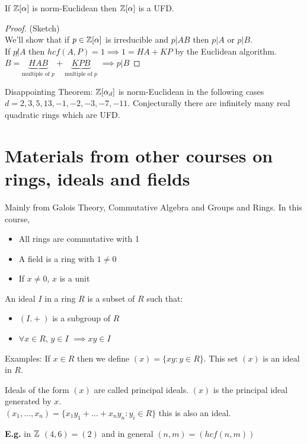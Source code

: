 \documentclass[11pt]{article}
\begin{document}
\begin{prop}
	If $\mathbb{Z}[\alpha]$ is norm-Euclidean then $\mathbb{Z}[\alpha]$ is a UFD.
\end{prop}
\begin{proof}
	(Sketch)\\
	We'll show that if $p \in \mathbb{Z}[\alpha]$ is irreducible and $p|AB$ then $p|A$ or $p|B$.\\
	If $p \not | A $ then $ hcf(A,P) = 1 \implies 1 = HA+KP$ by the Euclidean algorithm.\\
	$B = \underbrace{HAB}_\text{multiple of $p$} +\underbrace{KPB}_\text{multiple of $p$}$ $\implies p | B$
\end{proof}

\begin{theorem}
	Disappointing Theorem: $\mathbb{Z}[\alpha_d] $ is norm-Euclidean in the following cases $d = 2,3,5,13,-1,-2,-3,-7,-11$.
	Conjecturally there are infinitely many real quadratic rings which are UFD.
\end{theorem}

\section{Materials from other courses on rings, ideals and fields}
Mainly from Galois Theory, Commutative Algebra and Groups and Rings. 
In this course, 

\begin{itemize}
	\item{All rings are commutative with 1}
	\item{A field is a ring with $1 \neq 0$}
	\item{If $x\neq 0$, $x$ is a unit }
\end{itemize}

\begin{defn}
An ideal $I$ in a ring $R$ is a subset of $R$ such that:

	\begin{itemize}
		\item{$(I.+)$ is a subgroup of $R$}
		\item{$\forall x \in R $, $y \in I$ $\implies xy \in I$}
	\end{itemize}
\end{defn}
$ $\\
Examples: If $x \in R$ then we define $(x) = \{ xy: y \in R \}$.
This set $(x)$ is an ideal in $R$.


\begin{defn}
	Ideals of the form $(x)$ are called principal ideals. 
	$(x)$ is the principal ideal generated by $x$.\\
	$(x_1, \dots, x_n) = \{x_1y_1 + \dots + x_ny_n : y_i \in R\}$ this is also an ideal.
\end{defn}
$ $\\[1em]
\textbf{E.g.} in $\mathbb{Z}$ $(4,6) = (2)$ and in general $(n,m) = (hcf(n,m))$
\end{document}

